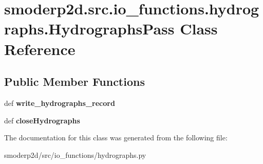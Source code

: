 \hypertarget{classsmoderp2d_1_1src_1_1io__functions_1_1hydrographs_1_1HydrographsPass}{\section{smoderp2d.\-src.\-io\-\_\-functions.\-hydrographs.\-Hydrographs\-Pass Class Reference}
\label{classsmoderp2d_1_1src_1_1io__functions_1_1hydrographs_1_1HydrographsPass}
}
\subsection*{Public Member Functions}
\begin{DoxyCompactItemize}
\item 
\hypertarget{classsmoderp2d_1_1src_1_1io__functions_1_1hydrographs_1_1HydrographsPass_a76fee1fd128fa9c9d26fede127fc68b7}{def {\bfseries write\-\_\-hydrographs\-\_\-record}}\label{classsmoderp2d_1_1src_1_1io__functions_1_1hydrographs_1_1HydrographsPass_a76fee1fd128fa9c9d26fede127fc68b7}

\item 
\hypertarget{classsmoderp2d_1_1src_1_1io__functions_1_1hydrographs_1_1HydrographsPass_a8dc82a5cbcfa1d913f73004befa159e9}{def {\bfseries close\-Hydrographs}}\label{classsmoderp2d_1_1src_1_1io__functions_1_1hydrographs_1_1HydrographsPass_a8dc82a5cbcfa1d913f73004befa159e9}

\end{DoxyCompactItemize}


The documentation for this class was generated from the following file\-:\begin{DoxyCompactItemize}
\item 
smoderp2d/src/io\-\_\-functions/hydrographs.\-py\end{DoxyCompactItemize}
